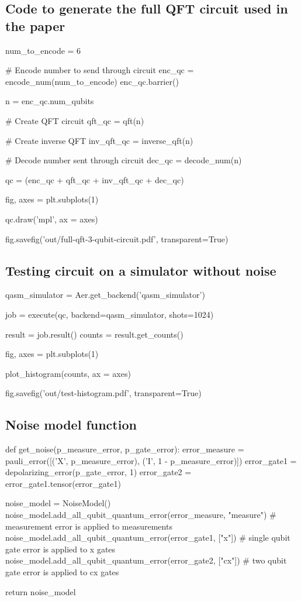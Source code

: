 \subsection{Code to generate the full QFT circuit used in the paper}
\label{subsec:generating-full-qft-circuit}

\begin{python}
num_to_encode = 6

# Encode number to send through circuit
enc_qc = encode_num(num_to_encode)
enc_qc.barrier()

n = enc_qc.num_qubits

# Create QFT circuit
qft_qc = qft(n)

# Create inverse QFT
inv_qft_qc = inverse_qft(n)

# Decode number sent through circuit
dec_qc = decode_num(n)


qc = (enc_qc + qft_qc + inv_qft_qc + dec_qc)

fig, axes = plt.subplots(1)

qc.draw('mpl', ax = axes)

fig.savefig('out/full-qft-3-qubit-circuit.pdf', transparent=True)
\end{python}

\subsection{Testing circuit on a simulator without noise}
\label{subsec:testing-circuit-simulator-no-noise}

\begin{python}
qasm_simulator = Aer.get_backend('qasm_simulator')

job = execute(qc, backend=qasm_simulator, shots=1024)

result = job.result()
counts = result.get_counts()

fig, axes = plt.subplots(1)

plot_histogram(counts, ax = axes)

fig.savefig('out/test-histogram.pdf', transparent=True)
\end{python}

\subsection{Noise model function}
\label{subsec:noise-model-function}

\begin{python}
def get_noise(p_measure_error, p_gate_error):
    error_measure = pauli_error([('X', p_measure_error), ('I', 1 - p_measure_error)])
    error_gate1 = depolarizing_error(p_gate_error, 1)
    error_gate2 = error_gate1.tensor(error_gate1)

    noise_model = NoiseModel()
    noise_model.add_all_qubit_quantum_error(error_measure, "measure") # measurement error is applied to measurements
    noise_model.add_all_qubit_quantum_error(error_gate1, ["x"]) # single qubit gate error is applied to x gates
    noise_model.add_all_qubit_quantum_error(error_gate2, ["cx"]) # two qubit gate error is applied to cx gates

    return noise_model
\end{python}
